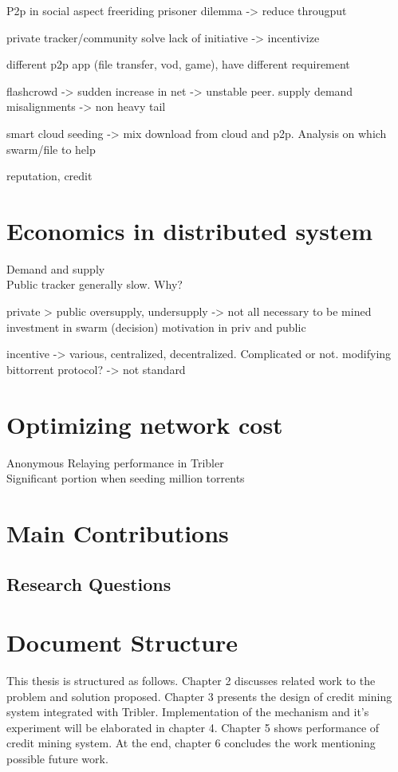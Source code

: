P2p in social aspect
freeriding
prisoner dilemma -> reduce througput

private tracker/community solve lack of initiative -> incentivize

different p2p app (file transfer, vod, game), have different requirement

flashcrowd -> sudden increase in net -> unstable peer. supply demand misalignments -> non heavy tail

smart cloud seeding -> mix download from cloud and p2p. Analysis on which swarm/file to help


reputation, credit


\section{Economics in distributed system}
Demand and supply \cite{2009:demandsupplyres:andrade}\\

Public tracker generally slow. Why? 

private > public
oversupply, undersupply -> not all necessary to be mined \cite{2015:sustainabilitypt:vinko}
investment in swarm (decision)
motivation in priv and public

incentive -> various, centralized, decentralized. Complicated or not. modifying bittorrent protocol? -> not standard 

\section{Optimizing network cost}
Anonymous Relaying performance in Tribler \cite{2015:onionroutetribler:stokkink}\\
Significant portion when seeding million torrents \cite{2012:milliontorrent:arvid}

\section{Main Contributions}

\subsection{Research Questions}

\section{Document Structure}
This thesis is structured as follows. Chapter 2 discusses related work to the problem and solution proposed. Chapter 3 presents the design of credit mining system integrated with Tribler. Implementation of the mechanism and it's experiment will be elaborated in chapter 4. Chapter 5 shows performance of credit mining system. At the end, chapter 6 concludes the work mentioning possible future work.
